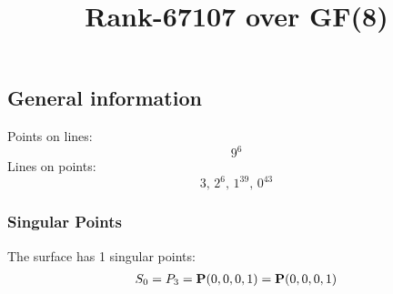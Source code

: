 \documentclass{article}
\newcommand\setTBstruts{\def\T{\rule{0pt}{2.6ex}}%
\def\B{\rule[-1.2ex]{0pt}{0pt}}}
\newcommand{\bP}{{\bf P}}
\begin{document}
 
\setTBstruts



{\allowdisplaybreaks%






\title{Rank-67107 over GF(8)}
\author{}%
\maketitle%
%
{}



\subsection*{General information}
Points on lines:
$$
9^6$$
Lines on points:
$$
3,\,2^6,\,1^{39},\,0^{43}$$
\subsubsection*{Singular Points}
The surface has 1 singular points:\\
\begin{align*}
S_{0} &= P_{3}=\bP(0, 0, 0, 1) = \bP(0, 0, 0, 1)\\
\end{align*}
}
\end{document}
